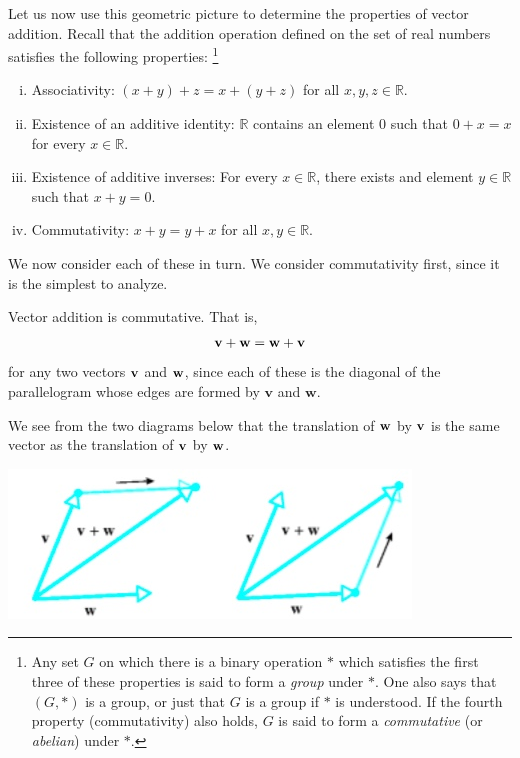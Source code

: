 \documentclass[12pt,letterpaper,reqno]{article}
\numberwithin{equation}{section}
\begin{document}
Let us now use this geometric picture to determine the properties of vector addition. Recall that the addition operation defined on the set of real numbers satisfies the following properties: \footnote{Any set $G$ on which there is a binary operation $*$ which satisfies the first three of these properties is said to form a \emph{group} under $*$. One also says that $(G,*)$ is a group, or just that $G$ is a group if $*$ is understood. If the fourth property (commutativity) also holds, $G$ is said to form a \emph{commutative} (or \emph{abelian}) under $*$.}
\begin{enumerate}[(i)]
	\item Associativity: $(x+y)+z=x+(y+z)$ for all $x,y,z \in \mathbb{R}$.
	\item Existence of an additive identity: $\mathbb{R}$ contains an element 0 such that $0+x=x$ for every $x \in \mathbb{R}$.
	\item Existence of additive inverses: For every $x \in \mathbb{R}$, there exists and element $y \in \mathbb{R}$ such that $x+y=0$.
	\item Commutativity: $x+y=y+x$ for all $x,y \in \mathbb{R}$.
\end{enumerate}
We now consider each of these in turn. We consider commutativity first, since it is the simplest to analyze.

\begin{prop}
	Vector addition is commutative. That is, 
	\begin{align*}
		{\bf v}+{\bf w}={\bf w}+{\bf v}
	\end{align*}
	for any two vectors ${\bf v}$ and ${\bf w}$, since each of these is the diagonal of the parallelogram whose edges are formed by $\mathbf{v}$ and $\mathbf{w}$.
\end{prop}

\begin{pf}
	We see from the two diagrams below that the translation of ${\bf w}$ by ${\bf v}$ is the same vector as the translation of ${\bf v}$ by ${\bf w}$.
\begin{center}
	\includegraphics[scale=0.5]{figures_mvc/equivalence_of_vector_addition}
\end{center}

\end{pf}
\end{document}
